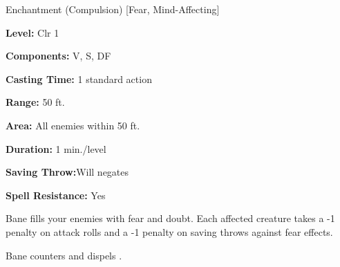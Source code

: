 
Enchantment (Compulsion) [Fear, Mind-Affecting]

\textbf{Level:} Clr 1

\textbf{Components:} V, S, DF

\textbf{Casting Time:} 1 standard action

\textbf{Range:} 50 ft.

\textbf{Area:} All enemies within 50 ft.

\textbf{Duration:} 1 min./level

\textbf{Saving Throw:}Will negates

\textbf{Spell Resistance:} Yes

Bane fills your enemies with fear and doubt. Each affected creature takes 
a -1 penalty on attack rolls and a -1 penalty on saving throws against fear effects.

Bane counters and dispels .

